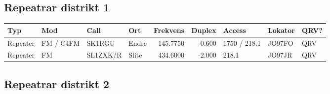 {\begin{landscape}
\clearpage

\subsection{Repeatrar distrikt 1}


\begin{longtable}{llllrrlll}
\bf Typ  & \bf Mod     & \bf Call & \bf Ort     & \bf Frekvens & \bf Duplex & \bf Access & \bf Lokator & \bf QRV? \\ \hline
Repeater   & FM / C4FM & SK1RGU   & Endre        & 145.7750     & -0.600     & 1750 / 218.1 & JO97FO      & QRV      \\
Repeater   & FM        & SL1ZXK/R & Slite        & 434.6000     & -2.000     & 218.1        & JO97JR      & QRV      \\
\end{longtable}



\subsection{Repeatrar distrikt 2}




\end{landscape}}
